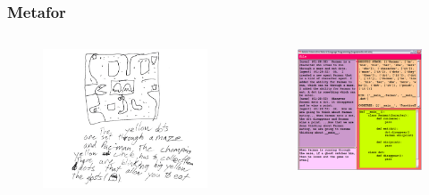 \documentclass[12pt]{beamer}
\begin{document}
\begin{frame}
\frametitle{Metafor}
\begin{columns}[c] %


\begin{figure}
\includegraphics[width=1.0\linewidth]{metafor}
\end{figure}

\begin{figure}
\includegraphics[width=1.0\linewidth]{metafor_gui}
\end{figure}
\end{columns}
\end{frame}
\end{document}
